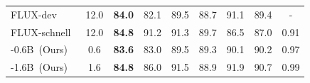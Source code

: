 \begin{table}[htbp]
{{\begin{tabular}{lc|cccccc|c}
    FLUX-dev~\citep{FLUX}                   & 12.0   & \textbf{84.0} & 82.1 & 89.5 & 88.7 & 91.1 & 89.4 & - \\
    FLUX-schnell~\citep{FLUX}               & 12.0   & \textbf{84.8} & 91.2 & 91.3 & 89.7 & 86.5 & 87.0 & 0.91 \\
    \midrule
    \textbf{\model{}}-0.6B~(Ours)                   & 0.6  & \textbf{83.6} & 83.0 & 89.5 & 89.3 & 90.1 & 90.2 & 0.97 \\ 
    \textbf{\model{}}-1.6B~(Ours)                  & 1.6  & \textbf{84.8} & 86.0 & 91.5 & 88.9 & 91.9 & 90.7 & 0.99 \\ 
    \bottomrule
    \end{tabular}
    }
    }
    \vspace{1ex}
\end{table}
